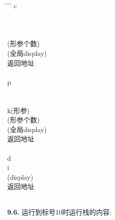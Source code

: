 \documentclass{article}
\begin{document}
\begin{tabbing}
    \hspace{1.5cm} \= \hspace{1.5cm} \= \hspace{1.5cm} \= \kill
     \> c\\

     \\

     \\

     \\

     (形参个数)\\

     (全局display)\\

     \> 返回地址\\

     \\

     \> p\\

     \\

     \\

     \> k(形参)\\

     (形参个数)\\

     (全局display)\\

     \> 返回地址\\

     \\

     \> d \\

     \> i\\

     (display)\\

     \> 返回地址\\

     \\

\end{tabbing}

\textbf{9.6.}
运行到标号10时运行栈的内容:
\end{document}

